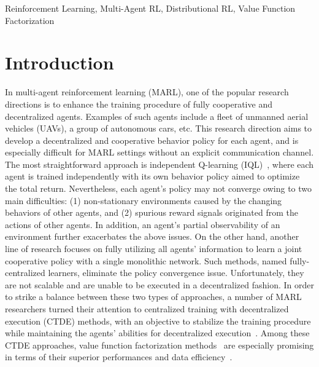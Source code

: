 \documentclass[twoside,11pt]{article}
\begin{document}
\begin{keywords}
  Reinforcement Learning, Multi-Agent RL, Distributional RL, Value Function Factorization
\end{keywords}

\section{Introduction}
\label{sec:introduction}


In multi-agent reinforcement learning (MARL), one of the popular research directions is to enhance the training procedure of fully cooperative and decentralized agents. Examples of such agents include a fleet of unmanned aerial vehicles (UAVs), a group of autonomous cars, etc. This research direction aims to develop a decentralized and cooperative behavior policy for each agent, and is especially difficult for MARL settings without an explicit communication channel. The most straightforward approach is independent Q-learning (IQL)~\citep{Tan1993IQL}, where each agent is trained independently with its own behavior policy aimed to optimize the total return. Nevertheless, each agent's policy may not converge owing to two main difficulties: (1) non-stationary environments caused by the changing behaviors of other agents, and (2) spurious reward signals originated from the actions of other agents. In addition, an agent’s partial observability of an environment further exacerbates the above issues.
On the other hand, another line of research focuses on fully utilizing all agents' information to learn a joint cooperative policy with a single monolithic network. Such methods, named fully-centralized learners, eliminate the policy convergence issue. Unfortunately, they are not scalable and are unable to be executed in a decentralized fashion. In order to strike a balance between these two types of approaches, a number of MARL researchers turned their attention to centralized training with decentralized execution (CTDE) methods, with an objective to stabilize the training procedure while maintaining the agents' abilities for decentralized execution~\citep{Oliehoek2016CTDE}.
Among these CTDE approaches, value function factorization methods~\citep{Sunehag2018VDN,Rashid2018QMIX,Son2019QTRAN} are especially promising in terms of their superior performances and data efficiency~\citep{Samvelyan2019SMAC}.
\end{document}
